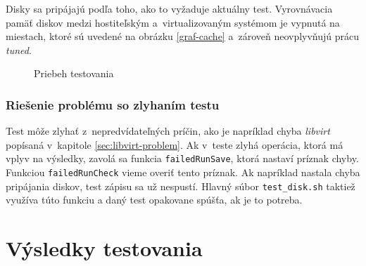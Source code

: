 Disky sa pripájajú podľa toho, ako to vyžaduje aktuálny test. Vyrovnávacia
pamäť diskov medzi hostiteľským a~virtualizovaným systémom je vypnutá na
miestach, ktoré sú uvedené na obrázku \ref{graf-cache} a~zároveň neovplyvňujú
prácu \emph{tuned}. 

%
%

\begin{figure}[H]
\begin{center}
  \caption{Priebeh testovania}
  \label{pic:testflow}
\end{center}
\end{figure}
%
%

\subsection{Riešenie problému so zlyhaním testu}
\label{sec:test-failure}

Test môže zlyhať z~nepredvídateľných príčin, ako je napríklad chyba
\emph{libvirt} popísaná v~kapitole \ref{sec:libvirt-problem}. Ak v~teste zlyhá
operácia, ktorá má vplyv na výsledky, zavolá sa funkcia \texttt{failedRunSave},
ktorá nastaví príznak chyby. Funkciou \texttt{failedRunCheck} vieme overiť
tento príznak. Ak napríklad nastala chyba pripájania diskov, test zápisu sa už
nespustí. Hlavný súbor \texttt{test\_disk.sh} taktiež využíva túto funkciu a
daný test opakovane spúšťa, ak je to potreba.

%
%

\chapter{Výsledky testovania}
\label{chap:test-results}

